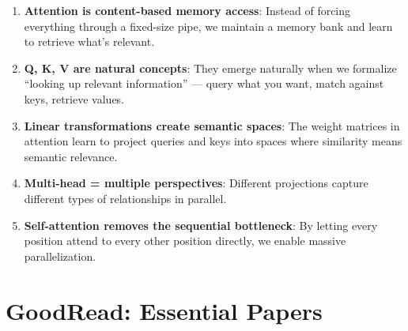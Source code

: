 \documentclass{article}
\begin{document}
\begin{tcolorbox}[colback=blue!5!white, colframe=blue!75!black, title=The Big Picture]
\begin{enumerate}
    \item \textbf{Attention is content-based memory access}: Instead of forcing everything through a fixed-size pipe, we maintain a memory bank and learn to retrieve what's relevant.

    \item \textbf{Q, K, V are natural concepts}: They emerge naturally when we formalize ``looking up relevant information'' — query what you want, match against keys, retrieve values.

    \item \textbf{Linear transformations create semantic spaces}: The weight matrices in attention learn to project queries and keys into spaces where similarity means semantic relevance.

    \item \textbf{Multi-head = multiple perspectives}: Different projections capture different types of relationships in parallel.

    \item \textbf{Self-attention removes the sequential bottleneck}: By letting every position attend to every other position directly, we enable massive parallelization.
\end{enumerate}
\end{tcolorbox}



\section{GoodRead: Essential Papers}
\end{document}
